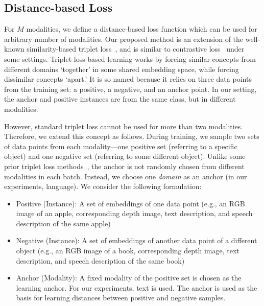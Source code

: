 \documentclass[sigconf,natbib=true,anonymous=true]{acmart}
\newcommand{\todokd}[1]{\todo[color=red!20]{{\small #1 -- Kasra}}}
\begin{document}
\subsection{Distance-based Loss}
\label{ssec:distanceloss}

For $M$ modalities, we define a distance-based loss function which can be used for arbitrary number of modalities. Our proposed method is an extension of the well-known similarity-based triplet loss~\cite{Carvalho-cooking-triplet,triplet_loss_2021_CVPR}, and is similar to contrastive loss~\cite{chen2020simple,NEURIPS2020_supervised_contrastive} under some settings.
Triplet loss-based learning works by forcing similar concepts from different domains `together' in some shared embedding space, while forcing dissimilar concepts `apart.' It is so named because it relies on three data points from the training set: a positive, a negative, and an anchor point. In our setting, the anchor and positive instances are from the same class, but in different modalities. 

However, standard triplet loss cannot be used for more than two modalities. Therefore, we extend this concept as follows. During training, we sample two sets of data points from each modality---one positive set (referring to a specific object) and one negative set (referring to some different object).
Unlike some prior triplet loss methods~\cite{GoLD_UMBC,triplet_loss_2021_CVPR}, the anchor is not randomly chosen from different modalities in each batch. Instead, we choose one \textit{domain} as an anchor (in our experiments, language). We consider the following formulation:

\begin{itemize}
    \item Positive (Instance): A set of embeddings of one data point (e.g., an RGB image of an apple, corresponding depth image, text description, and speech description of the same apple)
    \item Negative (Instance): A set of embeddings of another data point of a different object (e.g., an RGB image of a book, corresponding depth image, text description, and speech description of the same book)
    \item Anchor (Modality): A fixed modality of the positive set is chosen as the learning anchor. For our experiments, text is used. The anchor is used as the basis for learning distances between positive and negative samples.
\end{itemize}
\end{document}
